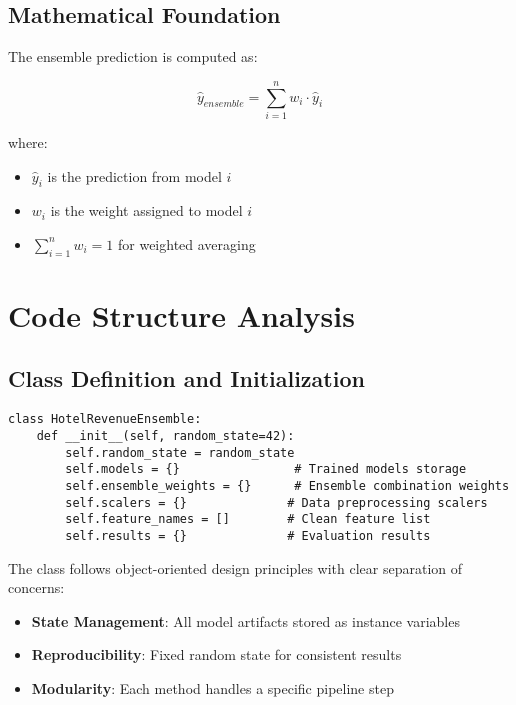 \documentclass[12pt,a4paper]{article}
\begin{document}
\subsection{Mathematical Foundation}

The ensemble prediction is computed as:

\begin{equation}
\hat{y}_{ensemble} = \sum_{i=1}^{n} w_i \cdot \hat{y}_i
\end{equation}

where:
\begin{itemize}
    \item $\hat{y}_i$ is the prediction from model $i$
    \item $w_i$ is the weight assigned to model $i$
    \item $\sum_{i=1}^{n} w_i = 1$ for weighted averaging
\end{itemize}

\section{Code Structure Analysis}

\subsection{Class Definition and Initialization}

\begin{lstlisting}[caption=HotelRevenueEnsemble Class Structure]
class HotelRevenueEnsemble:
    def __init__(self, random_state=42):
        self.random_state = random_state
        self.models = {}                # Trained models storage
        self.ensemble_weights = {}      # Ensemble combination weights
        self.scalers = {}              # Data preprocessing scalers
        self.feature_names = []        # Clean feature list
        self.results = {}              # Evaluation results
\end{lstlisting}

The class follows object-oriented design principles with clear separation of concerns:
\begin{itemize}
    \item \textbf{State Management}: All model artifacts stored as instance variables
    \item \textbf{Reproducibility}: Fixed random state for consistent results
    \item \textbf{Modularity}: Each method handles a specific pipeline step
\end{itemize}
\end{document}
